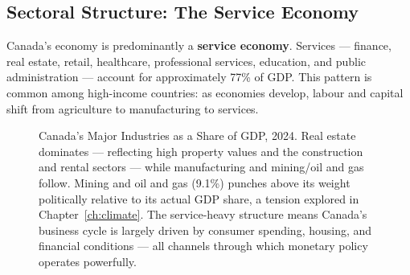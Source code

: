 \subsection{Sectoral Structure: The Service Economy}

Canada's economy is predominantly a \textbf{service economy}. Services ---
finance, real estate, retail, healthcare, professional services, education,
and public administration --- account for approximately 77\% of GDP. This
pattern is common among high-income countries: as economies develop, labour
and capital shift from agriculture to manufacturing to services.

\begin{figure}[H]
\centering
{}
\caption{Canada's Major Industries as a Share of GDP, 2024.
Real estate dominates --- reflecting high property values and the
construction and rental sectors --- while manufacturing and mining/oil
and gas follow. Mining and oil and gas (9.1\%) punches above its weight
politically relative to its actual GDP share, a tension explored in
Chapter~\ref{ch:climate}.
The service-heavy structure means Canada's business cycle is largely
driven by consumer spending, housing, and financial conditions --- all
channels through which monetary policy operates powerfully.}
\label{fig:gdp_by_industry}
\end{figure}

